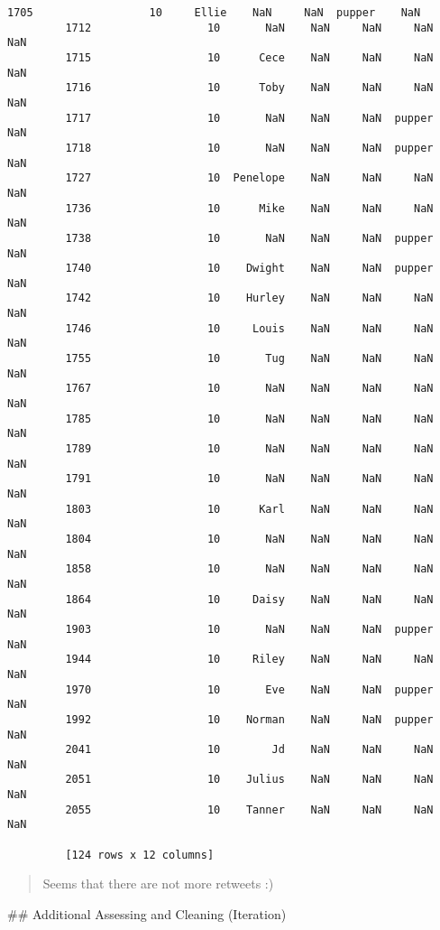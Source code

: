 \documentclass[11pt]{article}
\begin{document}
\begin{Verbatim}[commandchars=\\\{\}]
         1705                  10     Ellie    NaN     NaN  pupper    NaN  
         1712                  10       NaN    NaN     NaN     NaN    NaN  
         1715                  10      Cece    NaN     NaN     NaN    NaN  
         1716                  10      Toby    NaN     NaN     NaN    NaN  
         1717                  10       NaN    NaN     NaN  pupper    NaN  
         1718                  10       NaN    NaN     NaN  pupper    NaN  
         1727                  10  Penelope    NaN     NaN     NaN    NaN  
         1736                  10      Mike    NaN     NaN     NaN    NaN  
         1738                  10       NaN    NaN     NaN  pupper    NaN  
         1740                  10    Dwight    NaN     NaN  pupper    NaN  
         1742                  10    Hurley    NaN     NaN     NaN    NaN  
         1746                  10     Louis    NaN     NaN     NaN    NaN  
         1755                  10       Tug    NaN     NaN     NaN    NaN  
         1767                  10       NaN    NaN     NaN     NaN    NaN  
         1785                  10       NaN    NaN     NaN     NaN    NaN  
         1789                  10       NaN    NaN     NaN     NaN    NaN  
         1791                  10       NaN    NaN     NaN     NaN    NaN  
         1803                  10      Karl    NaN     NaN     NaN    NaN  
         1804                  10       NaN    NaN     NaN     NaN    NaN  
         1858                  10       NaN    NaN     NaN     NaN    NaN  
         1864                  10     Daisy    NaN     NaN     NaN    NaN  
         1903                  10       NaN    NaN     NaN  pupper    NaN  
         1944                  10     Riley    NaN     NaN     NaN    NaN  
         1970                  10       Eve    NaN     NaN  pupper    NaN  
         1992                  10    Norman    NaN     NaN  pupper    NaN  
         2041                  10        Jd    NaN     NaN     NaN    NaN  
         2051                  10    Julius    NaN     NaN     NaN    NaN  
         2055                  10    Tanner    NaN     NaN     NaN    NaN  
         
         [124 rows x 12 columns]
\end{Verbatim}
            
    \begin{quote}
Seems that there are not more retweets :)
\end{quote}

     \#\# Additional Assessing and Cleaning (Iteration)
\end{document}
